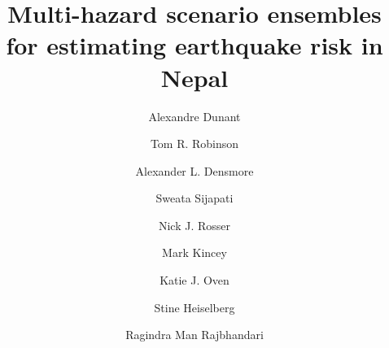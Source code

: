 \documentclass[preprint,12pt,authoryear]{elsarticle}
\begin{document}
\begin{frontmatter}

\title{Multi-hazard scenario ensembles for estimating earthquake risk in Nepal}

\author[inst1,inst2]{Alexandre Dunant}
\author[inst3]{Tom R. Robinson}
\author[inst1]{Alexander L. Densmore}
\author[inst4]{Sweata Sijapati}
\author[inst1]{Nick J. Rosser}
\author[inst5]{Mark Kincey}
\author[inst6]{Katie J. Oven}
\author[inst7]{Stine Heiselberg}
\author[inst7]{Ragindra Man Rajbhandari}




\address[inst1]{Institute of Hazard, Risk, and Resilience and Department of Geography, Durham University, Durham, UK}
\address[inst2]{Center for Climate Change and Transformation, EURAC, Bolzano, Italy}
\address[inst3]{School of Earth and Environment, University of Canterbury, Christchurch, New Zealand}
\address[inst4]{National Society for Earthquake Technology, Kathmandu, Nepal}
\address[inst5]{School of Geography, Politics, and Sociology, Newcastle University, Newcastle, UK}
\address[inst6]{Department of Geography and Environmental Sciences, Northumbria University, Newcastle, UK}
\address[inst7]{UN Resident Coordinator's Office, Kathmandu, Nepal}


\end{frontmatter}
\end{document}
